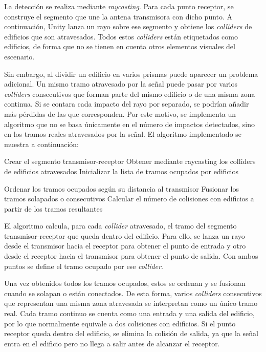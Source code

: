 La detección se realiza mediante \textit{raycasting}. Para cada punto receptor, se construye el segmento que une la antena transmisora con dicho punto. A continuación, Unity lanza un rayo sobre ese segmento y obtiene los \textit{colliders} de edificios que son atravesados. Todos estos \textit{colliders} están etiquetados como edificios, de forma que no se tienen en cuenta otros elementos visuales del escenario.

Sin embargo, al dividir un edificio en varios prismas puede aparecer un problema adicional. Un mismo tramo atravesado por la señal puede pasar por varios \textit{colliders} consecutivos que forman parte del mismo edificio o de una misma zona continua. Si se contara cada impacto del rayo por separado, se podrían añadir más pérdidas de las que corresponden. Por este motivo, se implementa un algoritmo que no se basa únicamente en el número de impactos detectados, sino en los tramos reales atravesados por la señal. El algoritmo implementado se muestra a continuación:

\begin{algorithm}[H]
\caption{Cálculo de colisiones con edificios}

Crear el segmento transmisor-receptor\;
Obtener mediante raycasting los colliders de edificios atravesados\;
Inicializar la lista de tramos ocupados por edificios\;

Ordenar los tramos ocupados según su distancia al transmisor\;
Fusionar los tramos solapados o consecutivos\;
Calcular el número de colisiones con edificios a partir de los tramos resultantes\;


\end{algorithm}

El algoritmo calcula, para cada \textit{collider} atravesado, el tramo del segmento transmisor-receptor que queda dentro del edificio. Para ello, se lanza un rayo desde el transmisor hacia el receptor para obtener el punto de entrada y otro desde el receptor hacia el transmisor para obtener el punto de salida. Con ambos puntos se define el tramo ocupado por ese \textit{collider}.

Una vez obtenidos todos los tramos ocupados, estos se ordenan y se fusionan cuando se solapan o están conectados. De esta forma, varios \textit{colliders} consecutivos que representan una misma zona atravesada se interpretan como un único tramo real. Cada tramo continuo se cuenta como una entrada y una salida del edificio, por lo que normalmente equivale a dos colisiones con edificios. Si el punto receptor queda dentro del edificio, se elimina la colisión de salida, ya que la señal entra en el edificio pero no llega a salir antes de alcanzar el receptor.

